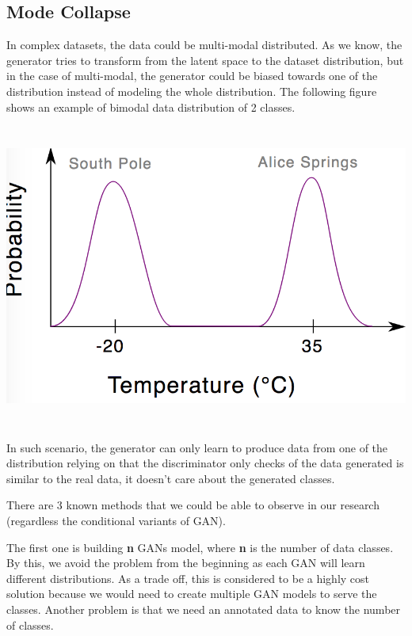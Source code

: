 \documentclass{winnower}
\begin{document}
\subsection{Mode Collapse}
In complex datasets, the data could be multi-modal distributed. As we know, the generator tries to transform from the latent space to the dataset distribution, but in the case of multi-modal, the generator could be biased towards one of the distribution instead of modeling the whole distribution. The following figure shows an example of bimodal data distribution of 2 classes.

\begin{center}
\includegraphics[width=14cm, height=10cm]{bimodal.png}
\end{center}

In such scenario, the generator can only learn to produce data from one of the distribution relying on that the discriminator only checks of the data generated is similar to the real data, it doesn't care about the generated classes. \newline

There are 3 known methods that we could be able to observe in our research (regardless the conditional variants of GAN). \newline

The first one is building \textbf{n} GANs model, where \textbf{n} is the number of data classes. By this, we avoid the problem from the beginning as each GAN will learn different distributions. As a trade off, this is considered to be a highly cost solution because we would need to create multiple GAN models to serve the classes. Another problem is that we need an annotated data to know the number of classes. \newline
\end{document}
